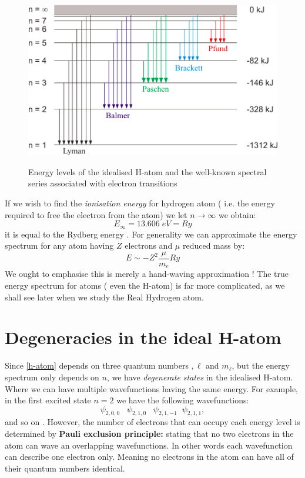 \begin{figure}[h]
	\centering
	\includegraphics[scale =0.6]{./figures/levels}
	\label{fig_1}
	\caption{ Energy levels of the idealised H-atom and the well-known spectral series associated with electron transitions}
\end{figure}
If we wish to find the \textit{ionisation energy  }  for hydrogen atom ( i.e. the energy required to free the electron from the atom) we let $ n\rightarrow \infty$ we obtain:
\[
E_\infty = 13.606 \; eV = Ry
\]
it is equal to the Rydberg energy .  For generality we can approximate the energy spectrum for any atom having $Z$ electrons and $ \mu$ reduced mass by:
\begin{equation}
E \sim -Z^2 \frac{\mu}{m_e}Ry
\end{equation}
We ought to emphasise this is merely a hand-waving approximation ! The true energy spectrum for atoms ( even the H-atom)  is far more complicated, as we shall see later when we study the Real Hydrogen atom.
\section{Degeneracies in the ideal H-atom}
Since \eqref{h-atom} depends on three quantum numbers $ , \ell$ and $ m_\ell$, but the energy spectrum only depends on $n$, we have \textit{degenerate states} in the idealised H-atom. Where we can have multiple wavefunctions having the same energy. For example, in the first excited state $ n=2$ we have the following wavefunctions:
\[
\psi_{2,0,0} \; \; \; \psi_{2,1,0}  \; \; \; \psi_{2,1,-1}  \;\; \psi_{2,1,1} ,
\]  
and so on .
However, the number of electrons that can occupy each energy level is determined by \textbf{Pauli exclusion principle:} stating that no two electrons in the atom can wave an overlapping wavefunctions. In other words each wavefunction can describe one electron only. Meaning no electrons in the atom can have all of their quantum numbers identical. 

